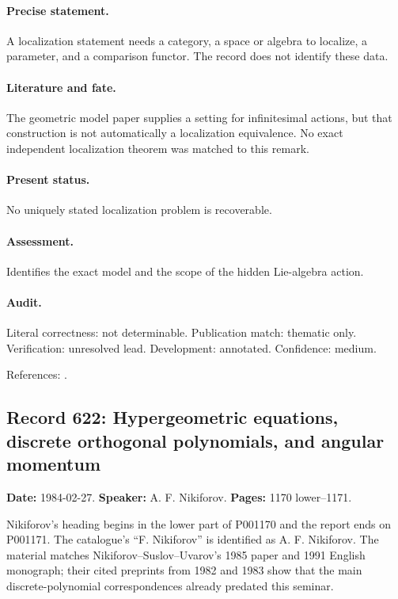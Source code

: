 \paragraph{Precise statement.} A localization statement needs a category, a space or algebra to localize, a parameter, and a comparison functor. The record does not identify these data.

\paragraph{Literature and fate.} The geometric model paper supplies a setting for infinitesimal actions, but that construction is not automatically a localization equivalence. No exact independent localization theorem was matched to this remark.

\paragraph{Present status.} No uniquely stated localization problem is recoverable.

\paragraph{Assessment.} Identifies the exact model and the scope of the hidden Lie-algebra action.

\paragraph{Audit.} Literal correctness: not determinable. Publication match: thematic only. Verification: unresolved lead. Development: annotated. Confidence: medium.

\noindent References: \citep{gelfandzelevinsky1984models}.\par

\subsection{Record 622: Hypergeometric equations, discrete orthogonal polynomials, and angular momentum}

\label{talk:622}

\noindent\textbf{Date:} 1984-02-27. \textbf{Speaker:} A. F. Nikiforov. \textbf{Pages:} 1170 lower--1171.\par

Nikiforov’s heading begins in the lower part of P001170 and the report ends on P001171. The catalogue’s “F. Nikiforov” is identified as A. F. Nikiforov. The material matches Nikiforov–Suslov–Uvarov’s 1985 paper and 1991 English monograph; their cited preprints from 1982 and 1983 show that the main discrete-polynomial correspondences already predated this seminar.

